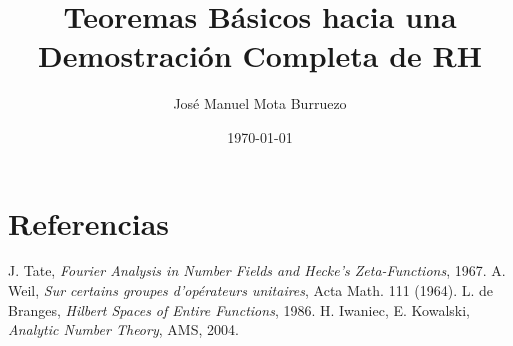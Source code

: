 \documentclass[11pt]{article}
\title{Teoremas Básicos hacia una Demostración Completa de RH}
\author{José Manuel Mota Burruezo}
\date{\today}
\begin{document}
\maketitle
\tableofcontents








\section*{Referencias}
\begin{thebibliography}{9}
J. Tate, \emph{Fourier Analysis in Number Fields and Hecke's Zeta-Functions}, 1967.
A. Weil, \emph{Sur certains groupes d'opérateurs unitaires}, Acta Math. 111 (1964).
L. de Branges, \emph{Hilbert Spaces of Entire Functions}, 1986.
H. Iwaniec, E. Kowalski, \emph{Analytic Number Theory}, AMS, 2004.
\end{thebibliography}
\end{document}
